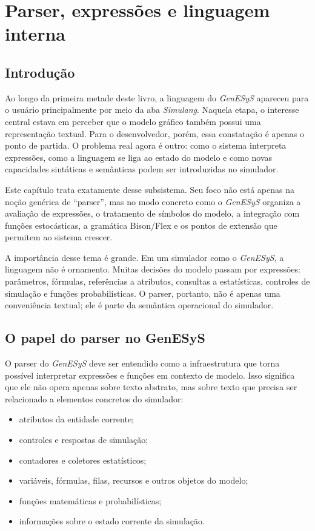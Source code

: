 \chapter{Parser, expressões e linguagem interna}
\label{chap:parser_expressoes_linguagem_interna}

\section{Introdução}
\label{sec:cap9_introducao}

Ao longo da primeira metade deste livro, a linguagem do \textit{GenESyS} apareceu para o usuário principalmente por meio da aba \textit{Simulang}. Naquela etapa, o interesse central estava em perceber que o modelo gráfico também possui uma representação textual. Para o desenvolvedor, porém, essa constatação é apenas o ponto de partida. O problema real agora é outro: como o sistema interpreta expressões, como a linguagem se liga ao estado do modelo e como novas capacidades sintáticas e semânticas podem ser introduzidas no simulador.

Este capítulo trata exatamente desse subsistema. Seu foco não está apenas na noção genérica de ``parser'', mas no modo concreto como o \textit{GenESyS} organiza a avaliação de expressões, o tratamento de símbolos do modelo, a integração com funções estocásticas, a gramática Bison/Flex e os pontos de extensão que permitem ao sistema crescer.

A importância desse tema é grande. Em um simulador como o \textit{GenESyS}, a linguagem não é ornamento. Muitas decisões do modelo passam por expressões: parâmetros, fórmulas, referências a atributos, consultas a estatísticas, controles de simulação e funções probabilísticas. O parser, portanto, não é apenas uma conveniência textual; ele é parte da semântica operacional do simulador.

\section{O papel do parser no GenESyS}
\label{sec:cap9_papel_parser_genesys}

O parser do \textit{GenESyS} deve ser entendido como a infraestrutura que torna possível interpretar expressões e funções em contexto de modelo. Isso significa que ele não opera apenas sobre texto abstrato, mas sobre texto que precisa ser relacionado a elementos concretos do simulador:
\begin{itemize}
    \item atributos da entidade corrente;
    \item controles e respostas de simulação;
    \item contadores e coletores estatísticos;
    \item variáveis, fórmulas, filas, recursos e outros objetos do modelo;
    \item funções matemáticas e probabilísticas;
    \item informações sobre o estado corrente da simulação.
\end{itemize}


